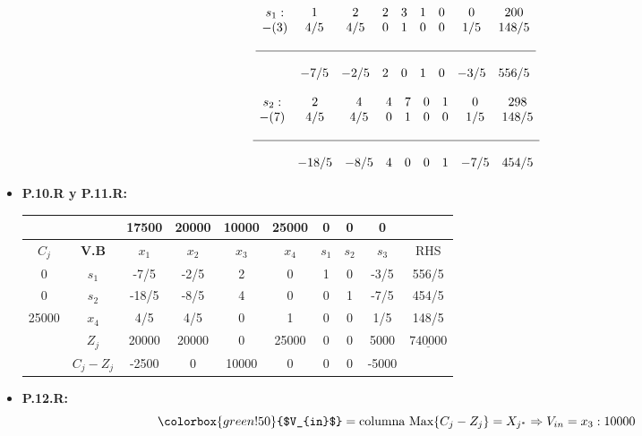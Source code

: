 \documentclass{templateNote}
\begin{document}
\begin{itemize}
    \begin{equation*}
        \begin{array}{ccccccccc}
            s_1: & 1 & 2 & 2 & 3 & 1 & 0 & 0 & 200 \\
            -(3) & 4/5 & 4/5 & 0 & 1 & 0 & 0 & 1/5 & 148/5 \\
            \\ \hline \\
            & -7/5 & -2/5 & 2 & 0 & 1 & 0 & -3/5 & 556/5
        \end{array}
    \end{equation*}
    
    \begin{equation*}
        \begin{array}{ccccccccc}
            s_2: & 2 & 4 & 4 & 7 & 0 & 1 & 0 & 298 \\
            -(7) & 4/5 & 4/5 & 0 & 1 & 0 & 0 & 1/5 & 148/5 \\
            \\ \hline \\
            & -18/5 & -8/5 & 4 & 0 & 0 & 1 & -7/5 & 454 /5
        \end{array}
    \end{equation*}

    \item \textbf{P.10.R y P.11.R:}
    \begin{center}
        \begin{tabular}{|c|c|c|c|c|c|c|c|c|c|}
            \hline
            & & 17500 & 20000 & 10000 & 25000 & 0 & 0 & 0 & \\ \hline
            $C_j$ & \textbf{V.B} & $x_1$ & $x_2$ & $x_3$ & $x_4$ & $s_1$ & $s_2$ & $s_3$ & RHS \\ \hline
            0 & $s_1$ & -7/5 & -2/5 & 2 & 0 & 1 & 0 & -3/5 & 556/5 \\
            0 & $s_2$ & -18/5 & -8/5 & 4 & 0 & 0 & 1 & -7/5 & 454/5 \\
            25000 & $x_4$ & 4/5 & 4/5 & 0 & 1 & 0 & 0 & 1/5 & 148/5 \\ \hline
            & $Z_j$ & 20000 & 20000 & 0 & 25000 & 0 & 0 & 5000 & $\underline{740000}$ \\ \hline
            & $C_j - Z_j$ & -2500 & 0 & 10000 & 0 & 0 & 0 & -5000 & \\ \hline
        \end{tabular}
    \end{center}

    \item \textbf{P.12.R:}
    \begin{equation*}
        \colorbox{green!50}{$V_{in}$} = \text{columna Max} \{C_j-Z_j\} = X_{j^*} \Rightarrow V_{in} = x_3 : 10000
    \end{equation*}


\end{itemize}
\end{document}
